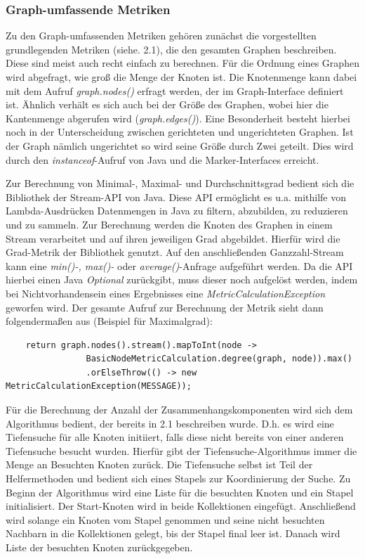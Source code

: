\documentclass[a4paper,12pt,ngerman,chapterprefix=false,listof=totoc,bibliography=totoc]{scrreprt}
\begin{document}
{{\subsubsection*{Graph-umfassende Metriken}
{
Zu den Graph-umfassenden Metriken gehören zunächst die vorgestellten grundlegenden Metriken (siehe. 2.1), die den gesamten Graphen beschreiben. Diese sind meist auch recht einfach zu berechnen. Für die Ordnung eines Graphen wird abgefragt, wie groß die Menge der Knoten ist. Die Knotenmenge kann dabei mit dem Aufruf \textit{graph.nodes()} erfragt werden, der im Graph-Interface definiert ist. Ähnlich verhält es sich auch bei der Größe des Graphen, wobei hier die Kantenmenge abgerufen wird (\textit{graph.edges()}). Eine Besonderheit besteht hierbei noch in der Unterscheidung zwischen gerichteten und ungerichteten Graphen. Ist der Graph nämlich ungerichtet so wird seine Größe durch Zwei geteilt. Dies wird durch den \textit{instanceof}-Aufruf von Java und die Marker-Interfaces erreicht.

Zur Berechnung von Minimal-, Maximal- und Durchschnittsgrad bedient sich die Bibliothek der Stream-API von Java. Diese API ermöglicht es u.a. mithilfe von Lambda-Ausdrücken Datenmengen in Java zu filtern, abzubilden, zu reduzieren und zu sammeln. \cite{ullenboom_java_2014} Zur Berechnung werden die Knoten des Graphen in einem Stream verarbeitet und auf ihren jeweiligen Grad abgebildet. Hierfür wird die Grad-Metrik der Bibliothek genutzt. Auf den anschließenden Ganzzahl-Stream kann eine \textit{min()-, max()-} oder \textit{average()}-Anfrage aufgeführt werden. Da die API hierbei einen Java \textit{Optional} zurückgibt, muss dieser noch aufgelöst werden, indem bei Nichtvorhandensein eines Ergebnisses eine \textit{MetricCalculationException} geworfen wird. Der gesamte Aufruf zur Berechnung der Metrik sieht dann folgendermaßen aus (Beispiel für Maximalgrad):
\begin{lstlisting}
	return graph.nodes().stream().mapToInt(node ->
				BasicNodeMetricCalculation.degree(graph, node)).max()
				.orElseThrow(() -> new MetricCalculationException(MESSAGE));
\end{lstlisting}
Für die Berechnung der Anzahl der Zusammenhangskomponenten wird sich dem Algorithmus bedient, der bereits in 2.1 beschreiben wurde. D.h. es wird eine Tiefensuche für alle Knoten initiiert, falls diese nicht bereits von einer anderen Tiefensuche besucht wurden. Hierfür gibt der Tiefensuche-Algorithmus immer die Menge an Besuchten Knoten zurück. Die Tiefensuche selbst ist Teil der Helfermethoden und bedient sich eines Stapels zur Koordinierung der Suche. Zu Beginn der Algorithmus wird eine Liste für die besuchten Knoten und ein Stapel initialisiert. Der Start-Knoten wird in beide Kollektionen eingefügt. Anschließend wird solange ein Knoten vom Stapel genommen und seine nicht besuchten Nachbarn in die Kollektionen gelegt, bis der Stapel final leer ist. Danach wird Liste der besuchten Knoten zurückgegeben.

}}}
\end{document}
